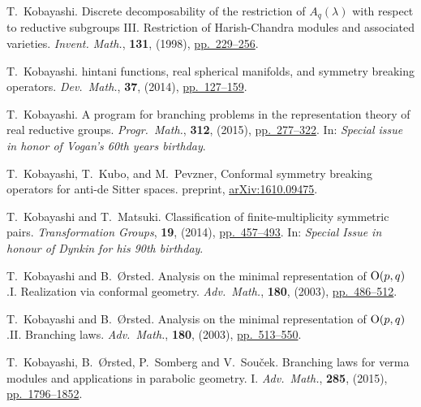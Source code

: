 \documentclass[reqno,12pt]{pja00} %
\theoremstyle{definition}
\theoremstyle{exampstyle} \newtheorem{examp}[theorem]{Theorem}
\begin{document}
\begin{thebibliography}{99}
T.~Kobayashi.
\newblock Discrete decomposability of the restriction of {$A_q(\lambda)$} with
  respect to reductive subgroups {III}. {R}estriction of {H}arish-{C}handra
  modules and associated varieties.
\newblock \emph{{\normalfont Invent. Math.}}, \textbf{131}, (1998), 
\href{http://dx.doi.org/10.1007/s002220050203}{pp.~229--256}.

T.~Kobayashi.
hintani functions, real spherical manifolds, and
  symmetry breaking operators.
  \newblock \emph{{\normalfont Dev.~Math.}}, \textbf{37}, (2014),
 \href{http://dx.doi.org/10.4171/OWR/2014/3}{pp.~127--159}.

T.~Kobayashi.
\newblock A program for branching problems in the representation theory of real
  reductive groups.
\newblock \emph{{\normalfont Progr.~Math.}}, \textbf{312}, (2015), 
\href{http://dx.doi.org/10.1007/978-3-319-23443-4_10}{pp.~277--322}.
\newblock In: \emph{{\normalfont Special issue in honor of Vogan's 60th years
  birthday}}.

T.~Kobayashi, T.~Kubo, and M.~Pevzner,
\newblock 
Conformal symmetry breaking operators for anti-de Sitter spaces.
preprint, 
\href{https://arxiv.org/abs/1610.09475}{arXiv:1610.09475}.

T.~Kobayashi and T.~Matsuki.
\newblock Classification of finite-multiplicity symmetric pairs.
\newblock \emph{{\normalfont Transformation Groups}}, \textbf{19}, (2014),
\href{http://dx.doi.org/10.1007/s00031-014-9265-x}{pp.~457--493}.
\newblock In: \emph{{\normalfont Special Issue in honour of Dynkin
  for his 90th birthday}}.


T.~Kobayashi and B.~{\O}rsted.
\newblock Analysis on the minimal representation of\/ {${\rm
  O}(p,q)$}.{\;}{{\rm{I}}. Realization via conformal geometry}.
\newblock \emph{\normalfont Adv.~Math.}, \textbf{180}, (2003),
\href{http://dx.doi.org/10.1016/S0001-8708(03)00012-4}{pp.~486--512}.

T.~Kobayashi and B.~{\O}rsted.
\newblock Analysis on the minimal representation of\/ {${\rm O}(p,q)$}.{\;}{{\rm{II}}}. {B}ranching laws.
\newblock \emph{\normalfont Adv.~Math.}, \textbf{180}, (2003),
\href{http://dx.doi.org/10.1016/S0001-8708(03)00013-6}{pp.~513--550}.

T.~Kobayashi, B.~{\O}rsted, P.~Somberg and V.~Sou{\v{c}}ek.
\newblock Branching laws for verma modules and applications in parabolic
  geometry. {I}.
\newblock \emph{{\normalfont Adv.~Math.}}, \textbf{285}, (2015),
\href{http://dx.doi.org/10.1016/j.aim.2015.08.020}{pp.~1796--1852}.


\end{thebibliography}
\end{document}

